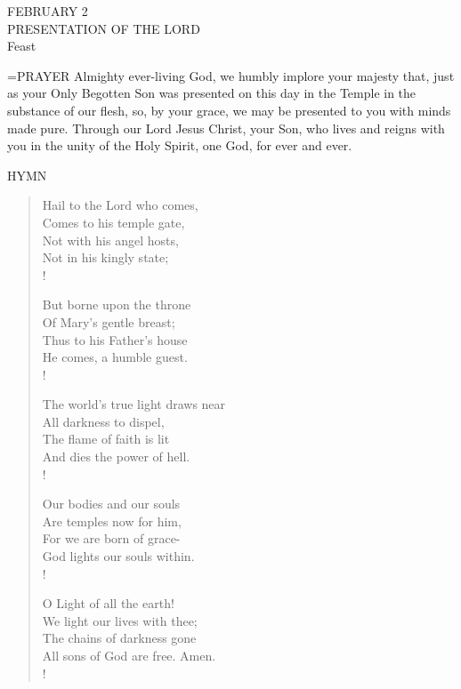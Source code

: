 \begin{center}\normalsize FEBRUARY 2\\
\footnotesize PRESENTATION OF THE LORD\\
\footnotesize Feast\\
\end{center}

\hangindent=\parindent \small{PRAYER 
Almighty ever-living God, we humbly implore your majesty that, just as your Only Begotten Son was presented on this day in the Temple in the substance of our flesh, so, by your grace, we may be presented to you with minds made pure. Through our Lord Jesus Christ, your Son, who lives and reigns with you in the unity of the Holy Spirit, one God, for ever and ever.\\}
 
\noindent\small{\uppercase{Hymn}}\normalsize\label{proper:presentationofthelord:hymn}
\begin{verse}
Hail to the Lord who comes,\\
Comes to his temple gate,\\
Not with his angel hosts,\\
Not in his kingly state;\\!

But borne upon the throne\\
Of Mary’s gentle breast;\\
Thus to his Father’s house\\
He comes, a humble guest.\\!

The world’s true light draws near\\
All darkness to dispel,\\
The flame of faith is lit\\
And dies the power of hell.\\!

Our bodies and our souls\\
Are temples now for him,\\
For we are born of grace-\\
God lights our souls within.\\!

O Light of all the earth!\\
We light our lives with thee;\\
The chains of darkness gone\\
All sons of God are free. Amen.\\!
\end{verse}

